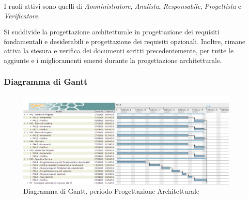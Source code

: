 I ruoli attivi sono quelli di \textit{Amministratore}, \textit{Analista}, \textit{Responsabile}, \textit{Progettista} e \textit{Verificatore}.

Si suddivide la progettazione architetturale in progettazione dei requisiti fondamentali e desiderabili e progettazione dei requisiti opzionali. Inoltre, rimane attiva la stesura e verifica dei documenti scritti precedentemente, per tutte le aggiunte e i miglioramenti emersi durante la progettazione architetturale.

\subsubsection{Diagramma di Gantt}
\begin{figure}[ht!]
  \includegraphics[width=1\textwidth]{res/img/pianificazione/ProgettazioneArchitetturale}
  \caption{Diagramma di Gantt, periodo Progettazione Architetturale}
\end{figure}


